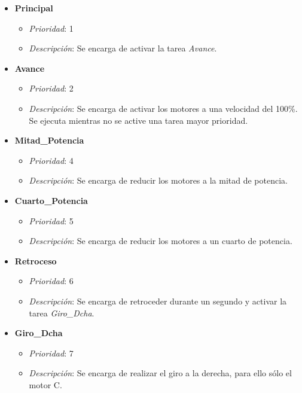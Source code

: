 \begin{itemize}
	
	\item \textbf{Principal}
		\begin{itemize}
			\item \textit{Prioridad}: 1
			\item \textit{Descripción}: Se encarga de activar la tarea \textit{Avance}.
		\end{itemize}

	\item \textbf{Avance}
		\begin{itemize}
			\item \textit{Prioridad}: 2
			\item \textit{Descripción}: Se encarga de activar los motores a una velocidad del 100\%. Se ejecuta mientras no se active una tarea mayor prioridad. 
		\end{itemize}
		
	\item \textbf{Mitad\_Potencia}
		\begin{itemize}
			\item \textit{Prioridad}: 4
			\item \textit{Descripción}: Se encarga de reducir los motores a la mitad de potencia.
		\end{itemize}

	\item \textbf{Cuarto\_Potencia}
		\begin{itemize}
			\item \textit{Prioridad}: 5
			\item \textit{Descripción}: Se encarga de reducir los motores a un cuarto de potencia.
		\end{itemize}	
		
		\item \textbf{Retroceso}
		\begin{itemize}
			\item \textit{Prioridad}: 6
			\item \textit{Descripción}: Se encarga de retroceder durante un segundo y activar la tarea \textit{Giro\_Dcha}.
		\end{itemize}
		
		
		\item \textbf{Giro\_Dcha}
		\begin{itemize}
			\item \textit{Prioridad}: 7
			\item \textit{Descripción}: Se encarga de realizar el giro a la derecha, para ello sólo el motor C.
		\end{itemize}
				

\end{itemize}
